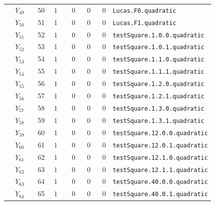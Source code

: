 {\begin{longtable}{@{}r r c r r r p{0.49\linewidth}@{}}
\(Y_{49}\) & 50 & \(1\) & 0 & 0 & 0 & \texttt{Lucas.\allowbreak{}F0.\allowbreak{}quadratic} \\
\(Y_{50}\) & 51 & \(1\) & 0 & 0 & 0 & \texttt{Lucas.\allowbreak{}F1.\allowbreak{}quadratic} \\
\(Y_{51}\) & 52 & \(1\) & 0 & 0 & 0 & \texttt{testSquare.\allowbreak{}1.\allowbreak{}0.\allowbreak{}0.\allowbreak{}quadratic} \\
\(Y_{52}\) & 53 & \(1\) & 0 & 0 & 0 & \texttt{testSquare.\allowbreak{}1.\allowbreak{}0.\allowbreak{}1.\allowbreak{}quadratic} \\
\(Y_{53}\) & 54 & \(1\) & 0 & 0 & 0 & \texttt{testSquare.\allowbreak{}1.\allowbreak{}1.\allowbreak{}0.\allowbreak{}quadratic} \\
\(Y_{54}\) & 55 & \(1\) & 0 & 0 & 0 & \texttt{testSquare.\allowbreak{}1.\allowbreak{}1.\allowbreak{}1.\allowbreak{}quadratic} \\
\(Y_{55}\) & 56 & \(1\) & 0 & 0 & 0 & \texttt{testSquare.\allowbreak{}1.\allowbreak{}2.\allowbreak{}0.\allowbreak{}quadratic} \\
\(Y_{56}\) & 57 & \(1\) & 0 & 0 & 0 & \texttt{testSquare.\allowbreak{}1.\allowbreak{}2.\allowbreak{}1.\allowbreak{}quadratic} \\
\(Y_{57}\) & 58 & \(1\) & 0 & 0 & 0 & \texttt{testSquare.\allowbreak{}1.\allowbreak{}3.\allowbreak{}0.\allowbreak{}quadratic} \\
\(Y_{58}\) & 59 & \(1\) & 0 & 0 & 0 & \texttt{testSquare.\allowbreak{}1.\allowbreak{}3.\allowbreak{}1.\allowbreak{}quadratic} \\
\(Y_{59}\) & 60 & \(1\) & 0 & 0 & 0 & \texttt{testSquare.\allowbreak{}12.\allowbreak{}0.\allowbreak{}0.\allowbreak{}quadratic} \\
\(Y_{60}\) & 61 & \(1\) & 0 & 0 & 0 & \texttt{testSquare.\allowbreak{}12.\allowbreak{}0.\allowbreak{}1.\allowbreak{}quadratic} \\
\(Y_{61}\) & 62 & \(1\) & 0 & 0 & 0 & \texttt{testSquare.\allowbreak{}12.\allowbreak{}1.\allowbreak{}0.\allowbreak{}quadratic} \\
\(Y_{62}\) & 63 & \(1\) & 0 & 0 & 0 & \texttt{testSquare.\allowbreak{}12.\allowbreak{}1.\allowbreak{}1.\allowbreak{}quadratic} \\
\(Y_{63}\) & 64 & \(1\) & 0 & 0 & 0 & \texttt{testSquare.\allowbreak{}40.\allowbreak{}0.\allowbreak{}0.\allowbreak{}quadratic} \\
\(Y_{64}\) & 65 & \(1\) & 0 & 0 & 0 & \texttt{testSquare.\allowbreak{}40.\allowbreak{}0.\allowbreak{}1.\allowbreak{}quadratic} \\

\end{longtable}}
